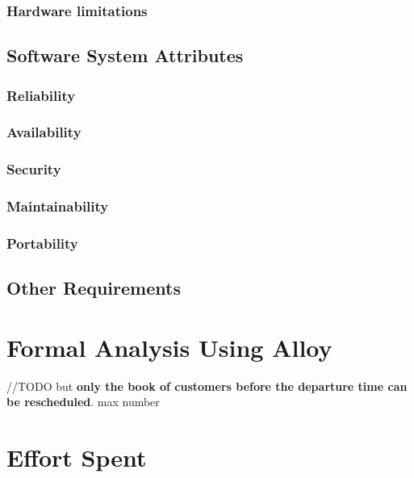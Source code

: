 \documentclass[a4paper,12pt]{book}
\begin{document}
\subsection{Hardware limitations}

\newpage
\section{Software System Attributes}
\subsection{Reliability}
\subsection{Availability}
\subsection{Security}
\subsection{Maintainability}
\subsection{Portability}

\newpage
\section{Other Requirements}

\chapter{Formal Analysis Using Alloy}

//TODO but \textbf{only the book of customers before the departure time can be rescheduled}. 
max number

\chapter{Effort Spent}
\end{document}
